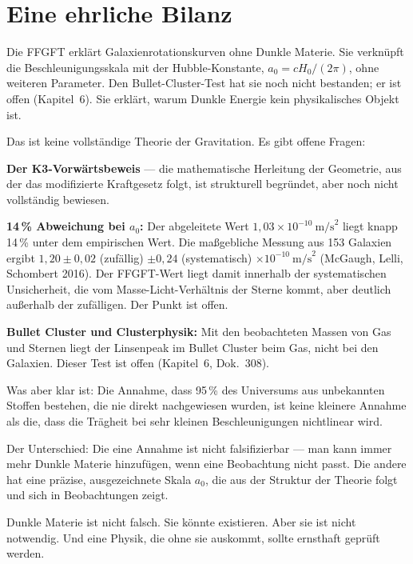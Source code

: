 \documentclass[11pt,oneside]{book}
\begin{document}
\chapter{Eine ehrliche Bilanz}

Die FFGFT erklärt Galaxienrotationskurven ohne Dunkle Materie.
Sie verknüpft die Beschleunigungsskala mit der Hubble-Konstante,
$a_0 = cH_0/(2\pi)$, ohne weiteren Parameter.
Den Bullet-Cluster-Test hat sie noch nicht bestanden;
er ist offen (Kapitel~6). Sie erklärt, warum Dunkle
Energie kein physikalisches Objekt ist.

Das ist keine vollständige Theorie der Gravitation. Es gibt
offene Fragen:

\textbf{Der K3-Vorwärtsbeweis} — die mathematische Herleitung
der Geometrie, aus der das modifizierte Kraftgesetz folgt,
ist strukturell begründet, aber noch nicht vollständig bewiesen.

\textbf{14\,\% Abweichung bei $a_0$:} Der abgeleitete Wert
$1{,}03 \times 10^{-10}~\text{m/s}^2$ liegt knapp 14\,\% unter
dem empirischen Wert. Die maßgebliche Messung aus 153 Galaxien
ergibt $1{,}20 \pm 0{,}02$ (zufällig) $\pm 0{,}24$ (systematisch)
$\times 10^{-10}~\text{m/s}^2$ (McGaugh, Lelli, Schombert 2016).
Der FFGFT-Wert liegt damit innerhalb der systematischen
Unsicherheit, die vom Masse-Licht-Verhältnis der Sterne kommt,
aber deutlich außerhalb der zufälligen. Der Punkt ist offen.

\textbf{Bullet Cluster und Clusterphysik:} Mit den beobachteten
Massen von Gas und Sternen liegt der Linsenpeak im Bullet
Cluster beim Gas, nicht bei den Galaxien. Dieser Test ist
offen (Kapitel~6, Dok.~308).

\medskip

Was aber klar ist: Die Annahme, dass 95\,\% des Universums
aus unbekannten Stoffen bestehen, die nie direkt nachgewiesen
wurden, ist keine kleinere Annahme als die, dass die Trägheit
bei sehr kleinen Beschleunigungen nichtlinear wird.

Der Unterschied: Die eine Annahme ist nicht falsifizierbar
— man kann immer mehr Dunkle Materie hinzufügen, wenn eine
Beobachtung nicht passt. Die andere hat eine präzise,
ausgezeichnete Skala $a_0$, die aus der Struktur der Theorie
folgt und sich in Beobachtungen zeigt.

Dunkle Materie ist nicht falsch. Sie könnte existieren. Aber
sie ist nicht notwendig. Und eine Physik, die ohne sie
auskommt, sollte ernsthaft geprüft werden.
\end{document}
